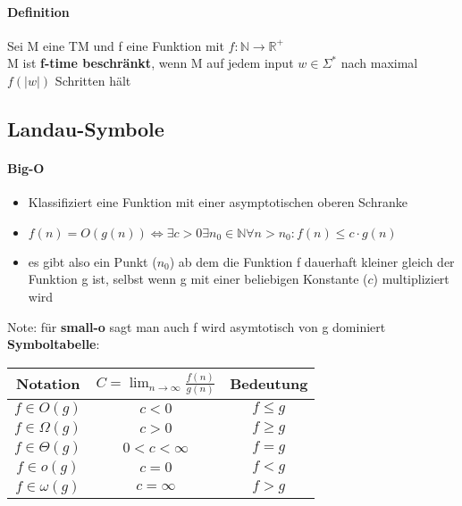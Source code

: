 \documentclass[12pt,a4paper]{article}
\begin{document}
\paragraph{Definition}
\flushleft
Sei M eine TM und f eine Funktion mit $f: \mathbb{N} \rightarrow \mathbb{R}^+$\\
M ist \textbf{f-time beschränkt}, wenn M auf jedem input $w \in \Sigma^*$ nach maximal $f(\vert w \vert)$ Schritten hält

\subsection{Landau-Symbole}
\paragraph{Big-O}
\begin{itemize}
\item Klassifiziert eine Funktion mit einer asymptotischen oberen Schranke\\
\item $f(n) = O(g(n)) \Leftrightarrow \exists c>0 \exists n_0 \in \mathbb{N} \forall n > n_0 : f(n) \leq c \cdot g(n)$
\item es gibt also ein Punkt ($n_0$) ab dem die Funktion f dauerhaft kleiner gleich der Funktion g ist, selbst wenn g mit einer beliebigen Konstante ($c$) multipliziert wird
\end{itemize}
Note: für \textbf{small-o} sagt man auch f wird asymtotisch von g dominiert\\

\textbf{Symboltabelle}:\\
\begin{tabular}{|c|c|c|}
\hline
Notation & $ C = \lim_{n\rightarrow \infty} \frac{f(n)}{g(n)}$ & Bedeutung \\
\hline
$f \in O(g)$ & $c < 0$ & $f\leq g$\\
\hline
$f \in \Omega(g)$ & $c >0$ & $f\geq g$\\
\hline
$f \in \Theta(g)$ & $0<c<\infty$ & $f=g$\\
\hline
$f \in o(g)$ & $c=0$ & $f<g$\\
\hline
$f \in \omega(g)$ & $c=\infty$ & $f>g$\\
\hline
\end{tabular}
\end{document}

